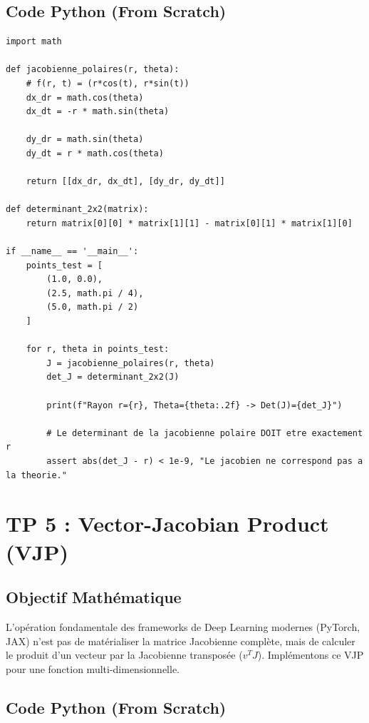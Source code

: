 \documentclass[11pt,a4paper]{article}
\begin{document}
\subsection*{Code Python (From Scratch)}

\begin{lstlisting}
import math

def jacobienne_polaires(r, theta):
    # f(r, t) = (r*cos(t), r*sin(t))
    dx_dr = math.cos(theta)
    dx_dt = -r * math.sin(theta)

    dy_dr = math.sin(theta)
    dy_dt = r * math.cos(theta)

    return [[dx_dr, dx_dt], [dy_dr, dy_dt]]

def determinant_2x2(matrix):
    return matrix[0][0] * matrix[1][1] - matrix[0][1] * matrix[1][0]

if __name__ == '__main__':
    points_test = [
        (1.0, 0.0),
        (2.5, math.pi / 4),
        (5.0, math.pi / 2)
    ]

    for r, theta in points_test:
        J = jacobienne_polaires(r, theta)
        det_J = determinant_2x2(J)

        print(f"Rayon r={r}, Theta={theta:.2f} -> Det(J)={det_J}")

        # Le determinant de la jacobienne polaire DOIT etre exactement r
        assert abs(det_J - r) < 1e-9, "Le jacobien ne correspond pas a la theorie."
\end{lstlisting}

\newpage
\section*{TP 5 : Vector-Jacobian Product (VJP)}

\subsection*{Objectif Mathématique}
L'opération fondamentale des frameworks de Deep Learning modernes (PyTorch, JAX) n'est pas de matérialiser la matrice Jacobienne complète, mais de calculer le produit d'un vecteur par la Jacobienne transposée ($v^T J$). Implémentons ce VJP pour une fonction multi-dimensionnelle.

\subsection*{Code Python (From Scratch)}
\end{document}
